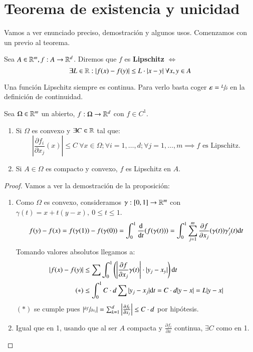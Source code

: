\section{Teorema de existencia y unicidad}
Vamos a ver enunciado preciso, demostración y algunos usos. Comenzamos con un previo al teorema.\\
\begin{dfn}
    Sea $A \in \mathbb{R}^m, f: A \to \mathbb{R}^d$. Diremos que $f$ es \textbf{Lipschitz} $\iff$
    $$
        \exists L \in \mathbb{R} : |f(x) - f(y)| \leq L \cdot |x - y|\ \forall x,y \in A
    $$
\end{dfn}
\begin{obs}
    Una función Lipschitz siempre es continua. Para verlo basta coger $\varepsilon = \sfrac{L}{\delta}$ en la definición de continuidad.
\end{obs}
\begin{pro}
    Sea $\Omega \in \mathbb{R}^m$ un abierto, $f:\Omega \to \mathbb{R}^d$ con $f \in C^1$.
    \begin{enumerate}
        \item Si $\Omega$ es convexo y $\exists C \in \mathbb{R}$ tal que:
        $$
            \left| \frac{\partial f_i}{\partial x_j} (x) \right| \leq C\ \forall x\in \Omega; \forall i = 1, \ldots, d; \forall j = 1, \ldots, m \implies f \text{ es Lipschitz.}
        $$
        \item Si $A \in \Omega$ es compacto y convexo, $f$ es Lipschitz en $A$.
    \end{enumerate}
\end{pro}
\begin{proof}
    Vamos a ver la demostración de la proposición:
    \begin{enumerate}
        \item
    Como $\Omega$ es convexo, consideramos $\gamma: [0,1] \to \mathbb{R}^m$ con $\gamma(t) = x + t(y-x),\ 0\leq t\leq 1$.
    $$
        f(y) - f(x) = f(\gamma(1)) - f(\gamma(0)) = \int_0^1 \frac{\mathrm{d}}{\mathrm{d}t} (f(\gamma(t))) = \int_0^1 \sum_{j=1}^m \frac{\partial f}{\partial x_j}(\gamma(t)) \gamma_j'(t) \mathrm{d} t
    $$
    Tomando valores absolutos llegamos a:
    \begin{align*}
        |f(x) - f(y)| &\leq \sum \int_0^1 \left(\left| \frac{\partial f}{\partial x_j} \gamma(t) \right| \cdot |y_j - x_y|\right) \mathrm{d} t\\
                     (*) & \leq \int_0^1 C\cdot d \sum |y_j - x_j| \mathrm{d} t =  C\cdot d |y -x| = L |y-x|
    \end{align*}
    $(*)$ se cumple pues $\left|\sfrac{\partial f}{\partial x_j}\right| = \sum_{k=1}^d \left| \frac{\partial f_k}{\partial x_j} \right| \leq C\cdot d$ por hipótesis.
    \item Igual que en 1, usando que al ser $A$ compacta y $\frac{\partial f_i}{\partial x}$ continua, $\exists C$ como en 1.
\end{enumerate}
\end{proof}
